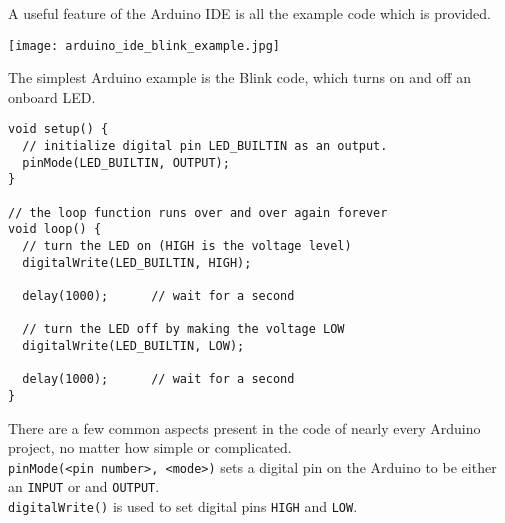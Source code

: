 \documentclass[../TinyBot.tex]{subfiles}
\begin{document}
\pagebreak
A useful feature of the Arduino IDE is all the example code which is provided.

\begin{center}
    \texttt{[image: arduino\_ide\_blink\_example.jpg]}
    \label{fig:ide-blink}
\end{center}

The simplest Arduino example is the Blink code, which turns on and off an onboard LED.

\begin{lstlisting}
void setup() {
  // initialize digital pin LED_BUILTIN as an output.
  pinMode(LED_BUILTIN, OUTPUT);
}

// the loop function runs over and over again forever
void loop() {
  // turn the LED on (HIGH is the voltage level)
  digitalWrite(LED_BUILTIN, HIGH); 

  delay(1000);      // wait for a second

  // turn the LED off by making the voltage LOW
  digitalWrite(LED_BUILTIN, LOW);  
  
  delay(1000);      // wait for a second
}
\end{lstlisting}


There are a few common aspects present in the code of nearly every Arduino project, no matter how simple or complicated. \\


\lstinline[]!pinMode(<pin number>, <mode>)! sets a digital pin on the Arduino to be either an \lstinline[]!INPUT! or and \lstinline[]!OUTPUT!. \\


\lstinline[]!digitalWrite()! is used to set digital pins \lstinline[]!HIGH! and \lstinline[]!LOW!.
\end{document}
